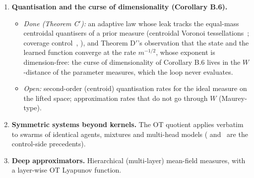 \begin{enumerate}[label=\arabic*.,leftmargin=*]
\begin{itemize}
      error): it is the weight-derivative of the leak's bias at the sampled weights, which the adaptive atoms remove.
      What remains is the coupled distance of the amplitude--mass gauge, conditional on representability, which the
      mass constraint replaces by the transit's mismatch, and at the measure level the cross-class transport common to
      both priors; the adaptive prior also removes the fixed prior's splitting instability. With an adaptive prior the
      real loop has perfect tracking as an invariant set at every representable sample. \emph{Open:} the gauge as a
      design input (the masses set the excitation spectrum $H_L(q)$); the floor law and its removal for a misplaced
      prior beyond first order.
    \item Transfer: transporting a learned measure to a new plant.
  \end{itemize}

\item \textbf{Quantisation and the curse of dimensionality (Corollary B.6).}
  \begin{itemize}
    \item \emph{Done (Theorem C$'$):} an adaptive law whose leak tracks the equal-mass centroidal quantisers of a prior
      measure (centroidal Voronoi tessellations~\cite{S20}; coverage control~\cite{S18}, \cite{R89}), and Theorem D$'$'s
      observation that the state and the learned function converge at the rate $m^{-1/2}$, whose exponent is
      dimension-free: the curse of dimensionality of Corollary B.6 lives in the $W$-distance of the parameter
      measures, which the loop never evaluates.
    \item \emph{Open:} second-order (centroid) quantisation rates for the ideal measure on the lifted space;
      approximation rates that do not go through $W$ (Maurey-type).
  \end{itemize}

\item \textbf{Symmetric systems beyond kernels.} The OT quotient applies verbatim to swarms of identical agents,
  mixtures and multi-head models (\cite{R88} and~\cite{R89} are the control-side precedents).

\item \textbf{Deep approximators.} Hierarchical (multi-layer) mean-field measures, with a layer-wise OT Lyapunov
  function.

\end{enumerate}
